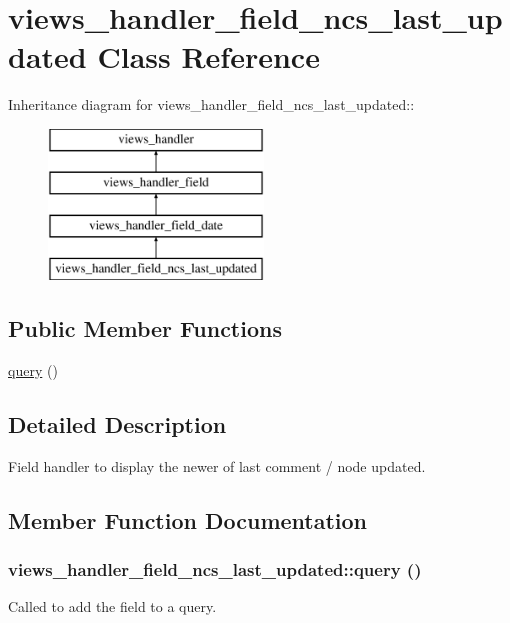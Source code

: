 \hypertarget{classviews__handler__field__ncs__last__updated}{
\section{views\_\-handler\_\-field\_\-ncs\_\-last\_\-updated Class Reference}
\label{classviews__handler__field__ncs__last__updated}
}
Inheritance diagram for views\_\-handler\_\-field\_\-ncs\_\-last\_\-updated::\begin{figure}[H]
\begin{center}
\leavevmode
\includegraphics[height=4cm]{classviews__handler__field__ncs__last__updated}
\end{center}
\end{figure}
\subsection*{Public Member Functions}
\begin{DoxyCompactItemize}
\item 
\hyperlink{classviews__handler__field__ncs__last__updated_a9fdf82c20960c14abf4aaa37c578b299}{query} ()
\end{DoxyCompactItemize}


\subsection{Detailed Description}
Field handler to display the newer of last comment / node updated. 

\subsection{Member Function Documentation}
\hypertarget{classviews__handler__field__ncs__last__updated_a9fdf82c20960c14abf4aaa37c578b299}{
\subsubsection[{query}]{\setlength{\rightskip}{0pt plus 5cm}views\_\-handler\_\-field\_\-ncs\_\-last\_\-updated::query ()}}
\label{classviews__handler__field__ncs__last__updated_a9fdf82c20960c14abf4aaa37c578b299}
Called to add the field to a query. 

